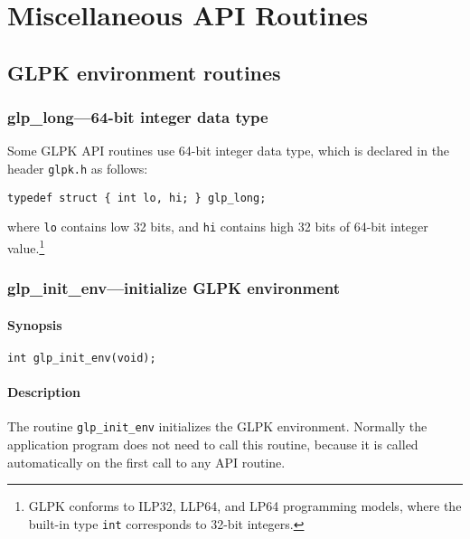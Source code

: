 
\chapter{Miscellaneous API Routines}

\section{GLPK environment routines}

\subsection{glp\_long---64-bit integer data type}

Some GLPK API routines use 64-bit integer data type, which is declared
in the header \verb|glpk.h| as follows:

\begin{verbatim}
typedef struct { int lo, hi; } glp_long;
\end{verbatim}

\noindent
where \verb|lo| contains low 32 bits, and \verb|hi| contains high 32
bits of 64-bit integer value.\footnote{GLPK conforms to ILP32, LLP64,
and LP64 programming models, where the built-in type {\tt int}
corresponds to 32-bit integers.}

\subsection{glp\_init\_env---initialize GLPK environment}

\subsubsection*{Synopsis}

\begin{verbatim}
int glp_init_env(void);
\end{verbatim}

\subsubsection*{Description}

The routine \verb|glp_init_env| initializes the GLPK environment.
Normally the application program does not need to call this routine,
because it is called automatically on the first call to any API routine.

\newpage


